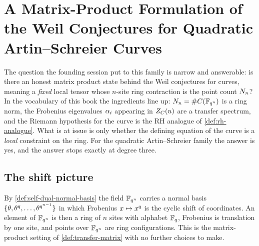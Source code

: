 
\section{A Matrix-Product Formulation of the Weil Conjectures for Quadratic Artin--Schreier Curves}
\label{sec:artin-schreier}

The question the founding session put to this family is narrow and answerable:
is there an honest matrix product state behind the Weil conjectures for
curves, meaning a \emph{fixed} local tensor whose $n$-site ring contraction is
the point count $N_{n}$? In the vocabulary of this book the ingredients
line up: $N_{n} = \#C(\mathbb F_{q^{n}})$ is a ring norm, the Frobenius
eigenvalues $\alpha_{i}$ appearing in $Z_C(u)$ are a transfer
spectrum, and the Riemann hypothesis for the curve is the RH analogue of
\cref{def:rh-analogue}. What is at issue is only whether the defining
equation of the curve is a \emph{local} constraint on the ring. For the
quadratic Artin--Schreier family the answer is yes, and the answer stops
exactly at degree three.

\subsection{The shift picture}

By \cref{def:self-dual-normal-basis} the field $\mathbb F_{q^{n}}$ carries a normal
basis $\{\theta,\theta^{q},\dots,\theta^{q^{n-1}}\}$ in which Frobenius
$x\mapsto x^{q}$ is the cyclic shift of coordinates. An element of
$\mathbb F_{q^{n}}$ is then a ring of $n$ sites with alphabet $\mathbb F_q$, Frobenius is
translation by one site, and points over $\mathbb F_{q^{n}}$ are ring configurations.
This is the matrix-product setting of \cref{def:transfer-matrix} with no
further choices to make.


